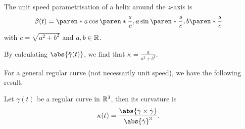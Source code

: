 \documentclass[11pt]{penrose}
\begin{document}
\begin{egg}
    The unit speed parametrisation of a helix around the $z$-axis is
    \begin{equation}
        \beta(t) = \paren*{ a \cos\paren*{\frac{s}{c}}, a \sin\paren*{\frac{s}{c}}, b\paren*{\frac{s}{c}} }
    \end{equation}
    with $c = \sqrt{a^2 + b^2}$ and $a, b \in \mathbb{R}$.

    By calculating $\abs{\ddot{\gamma}(t)}$, we find that $\kappa = \frac{a}{a^2 + b^2}$.
\end{egg}

For a general regular curve (not necessarily unit speed), we have the following result.
\begin{nprop}
    Let $\gamma(t)$ be a regular curve in $\mathbb{R}^3$, then its curvature is
    \begin{equation}
        \kappa(t) = \frac{\abs{ \ddot{\gamma} \times \dot{\gamma} }}{ \abs{\dot{\gamma}}^3 }.
    \end{equation}
\end{nprop}
\end{document}
